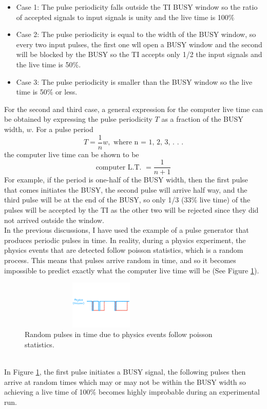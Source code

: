\documentclass[letterpaper, 12 pt, conference]{ieeeconf}  %
\begin{document}
\begin{itemize}
\item Case 1: The pulse periodicity falls outside the TI BUSY window so the ratio of accepted signals to input signals is unity and the live time is 100$\%$\\
\item Case 2: The pulse periodicity is equal to the width of the BUSY window, so every two input pulses, the first one wll open a BUSY window and the second will be blocked by the BUSY so the TI accepts only 1/2 the input signals and the live time is 50$\%$. \\
\item Case 3: The pulse periodicity is smaller than the BUSY window so the live time is 50$\%$ or less. 
\end{itemize}
For the second and third case, a general expression for the computer live time can be obtained by expressing the pulse periodicity $T$ as a fraction
of the BUSY width, $w$. For a pulse period
\begin{equation}\label{eq:period}
T = \frac{1}{n}w, \text{ where n = 1, 2, 3, . . .} 
\end{equation}
the computer live time can be shown to be 
\begin{equation}\label{eq:L.T.}
 \text{computer L.T. } = \frac{1}{n+1}
\end{equation}
For example, if the period is one-half of the BUSY width, then the first pulse that comes initiates the BUSY, the second pulse will arrive half way, and
the third pulse will be at the end of the BUSY, so only 1/3 (33$\%$ live time) of the pulses will be accepted by the TI as the other two will be rejected since they did
not arrived outside the window. \\
\indent In the previous discussions, I have used the example of a pulse generator that produces periodic pulses in time. In reality, during a physics experiment, the physics events
that are detected follow poisson statistics, which is a random process. This means that pulses arrive random in time, and so it becomes impossible to predict exactly what the computer
live time will be (See Figure \ref{fig:poisson_pulse}).
\begin{figure}[h!]
  \centering
  \includegraphics[width=3.1in, height=0.9in]{edtm/poisson_pulse.pdf}
  \caption{Random pulses in time due to physics events follow poisson statistics.}
  \label{fig:poisson_pulse}
\end{figure}\\
In Figure \ref{fig:poisson_pulse}, the first pulse initiates a BUSY signal, the following pulses then arrive at random times which may or may not be within the BUSY width so achieving a live
time of 100$\%$ becomes highly improbable during an experimental run.
\end{document}
